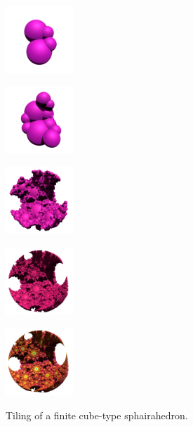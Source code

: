 \documentclass[suppldata, dvipdfmx]{interact}
\theoremstyle{plain}%
\theoremstyle{definition}
\theoremstyle{remark}
\theoremstyle{problemstyle}
\begin{document}
\begin{figure}[H]
 \begin{minipage}[t]{0.18\textwidth}
  \centering
  \includegraphics[width=1in, height=1in, keepaspectratio]{./img/visualization/sphereStep1.png}
  \label{}
 \end{minipage}
 \hspace*{\fill}
 \begin{minipage}[t]{0.18\textwidth}
  \centering
  \includegraphics[width=1in, height=1in, keepaspectratio]{./img/visualization/sphereStep2.png}
  \label{}
 \end{minipage}
 \hspace*{\fill}
 \begin{minipage}[t]{0.18\textwidth}
  \centering
  \includegraphics[width=1in, height=1in, keepaspectratio]{./img/visualization/sphereStep5.png}
  \label{}
 \end{minipage}
 \hspace*{\fill}
 \begin{minipage}[t]{0.18\textwidth}
  \centering
  \includegraphics[width=1in, height=1in, keepaspectratio]{./img/visualization/sphereStep10.png}
  \label{}
 \end{minipage}
 \hspace*{\fill}
 \begin{minipage}[t]{0.18\textwidth}
  \centering
  \includegraphics[width=1in, height=1in, keepaspectratio]{./img/visualization/sphereFinal.png}
  \label{}
 \end{minipage}
 \hspace*{\fill}
 \caption{Tiling of a finite cube-type sphairahedron.}
 \label{fig:visualizeSpheres}
\end{figure}
\end{document}
